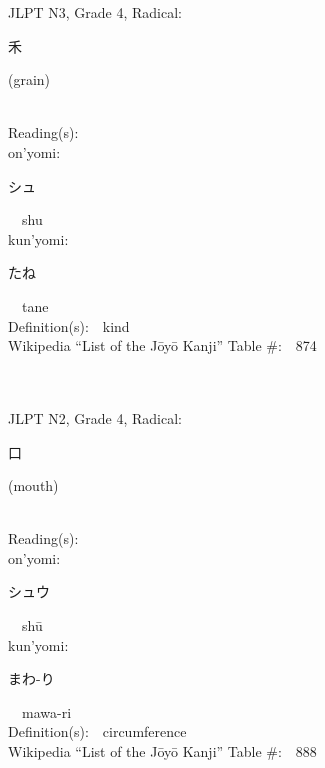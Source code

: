 \begin{multicols}{2}
{JLPT N3, Grade 4, Radical:\ \ {\begin{CJK}{UTF8}{min} 禾 \end{CJK}} (grain) } \\
Reading(s):\ \ \\
{\hspace*{1em}}on'yomi:\ \ \\
{\hspace*{2em}}{\begin{CJK}{UTF8}{min} シュ \end{CJK}}\ \ shu\ \ \\
{\hspace*{1em}}kun'yomi:\ \ \\
{\hspace*{2em}}{\begin{CJK}{UTF8}{min} たね \end{CJK}}\ \ tane\ \ \\
Definition(s):\ \ kind \\
Wikipedia ``List of the J\=oy\=o Kanji'' Table \#:\ \ 874 \\
\ \ \\
{\fontsize{34pt}{40pt}  }\ \ \\  %
{JLPT N2, Grade 4, Radical:\ \ {\begin{CJK}{UTF8}{min} 口 \end{CJK}} (mouth) } \\
Reading(s):\ \ \\
{\hspace*{1em}}on'yomi:\ \ \\
{\hspace*{2em}}{\begin{CJK}{UTF8}{min} シュウ \end{CJK}}\ \ sh\=u\ \ \\
{\hspace*{1em}}kun'yomi:\ \ \\
{\hspace*{2em}}{\begin{CJK}{UTF8}{min} まわ-り \end{CJK}}\ \ mawa-ri\ \ \\
Definition(s):\ \ circumference \\
Wikipedia ``List of the J\=oy\=o Kanji'' Table \#:\ \ 888 \\
\ \ \\
{\fontsize{34pt}{40pt}  }\ \ \\  %

\end{multicols}
